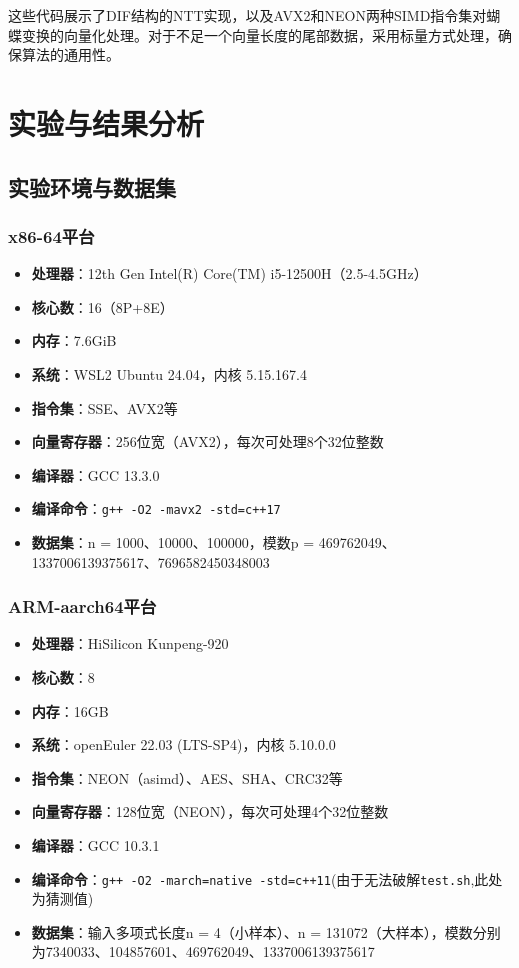 \documentclass[a4paper,colorlinks=true,linkcolor=blue,urlcolor=blue,citecolor=green,bookmarks=true]{article}
\begin{document}
这些代码展示了DIF结构的NTT实现，以及AVX2和NEON两种SIMD指令集对蝴蝶变换的向量化处理。对于不足一个向量长度的尾部数据，采用标量方式处理，确保算法的通用性。

\section{实验与结果分析}

\subsection{实验环境与数据集}

\subsubsection{x86-64平台}
\begin{itemize}
  \item \textbf{处理器}：12th Gen Intel(R) Core(TM) i5-12500H（2.5-4.5GHz）
  \item \textbf{核心数}：16（8P+8E）
  \item \textbf{内存}：7.6GiB
  \item \textbf{系统}：WSL2 Ubuntu 24.04，内核 5.15.167.4
  \item \textbf{指令集}：SSE、AVX2等
  \item \textbf{向量寄存器}：256位宽（AVX2），每次可处理8个32位整数
  \item \textbf{编译器}：GCC 13.3.0
  \item \textbf{编译命令}：\verb|g++ -O2 -mavx2 -std=c++17|
  \item \textbf{数据集}：n = 1000、10000、100000，模数p = 469762049、1337006139375617、7696582450348003
\end{itemize}

\subsubsection{ARM-aarch64平台}
\begin{itemize}
  \item \textbf{处理器}：HiSilicon Kunpeng-920
  \item \textbf{核心数}：8
  \item \textbf{内存}：16GB
  \item \textbf{系统}：openEuler 22.03 (LTS-SP4)，内核 5.10.0.0
  \item \textbf{指令集}：NEON（asimd）、AES、SHA、CRC32等\cite{arm-neon}
  \item \textbf{向量寄存器}：128位宽（NEON），每次可处理4个32位整数
  \item \textbf{编译器}：GCC 10.3.1
  \item \textbf{编译命令}：\verb|g++ -O2 -march=native -std=c++11|(由于无法破解\verb|test.sh|,此处为猜测值)
  \item \textbf{数据集}：输入多项式长度n = 4（小样本）、n = 131072（大样本），模数分别为7340033、104857601、469762049、1337006139375617\cite{ntt-guide}
\end{itemize}
\end{document}
